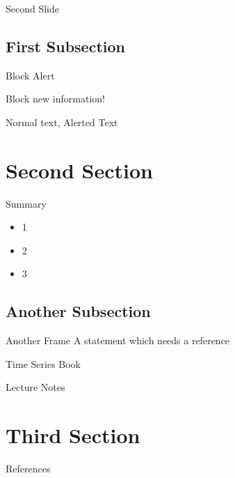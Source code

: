 \documentclass{beamer}
\begin{document}
\begin{frame}{Second Slide}
    
\end{frame}

\subsection{First Subsection}
\begin{frame}{Block Alert}
    \begin{block}{Block}
        new information!
    \end{block}

    \vfill

    Normal text, \alert{Alerted Text}

\end{frame}

\section{Second Section}
\begin{frame}{Summary}
    \begin{itemize}
        \item 1
        \item 2
        \item 3
    \end{itemize}
\end{frame}

\subsection{Another Subsection}
\begin{frame}{Another Frame}
    A statement which needs a reference \cite{origin}

    Time Series Book \cite{hyndman}

    Lecture Notes \cite{MATH334}
\end{frame}

\section{Third Section}

\begin{frame}{References}
    
    
\end{frame}
\end{document}
